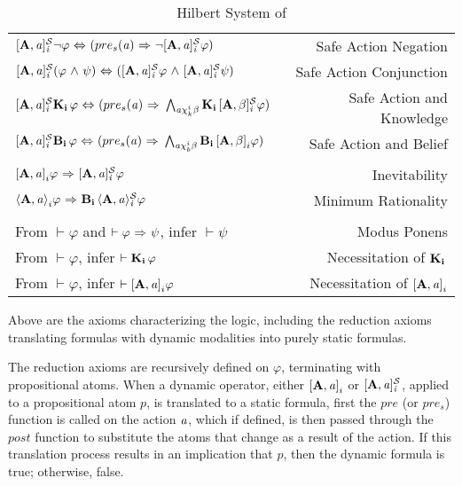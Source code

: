 \begin{table}[H]
\begin{center}
\begin{tabular}{| l r |}
    $\mathbf{[A,\mathit{a}]_{\mathit{i}}^\mathcal{S}}{\neg} \varphi {\ \Leftrightarrow \ } (pre_s(\mathit{a}) {\ \Rightarrow \ } {\neg} \mathbf{[A,\mathit{a}]_{\mathit{i}}^\mathcal{S}}\varphi)$ & Safe Action Negation\\
    $\mathbf{[A,\mathit{a}]_{\mathit{i}}^\mathcal{S}}(\varphi {\ \wedge \ } \psi) {\ \Leftrightarrow \ } (\mathbf{[A,\mathit{a}]_{\mathit{i}}^\mathcal{S}}\varphi {\ \wedge \ } \mathbf{[A,\mathit{a}]_{\mathit{i}}^\mathcal{S}}\psi)$ & Safe Action Conjunction\\
    $\mathbf{[A,\mathit{a}]_{\mathit{i}}^\mathcal{S}}\mathbf{K}_{\mathbf{i}}\,\varphi {\ \Leftrightarrow \ } (pre_s(\mathit{a}){\ \Rightarrow \ } \bigwedge_{\mathit{a}\chi_{k}^i\beta}\mathbf{K}_{\mathbf{i}}\,\mathbf{[A,\beta]_{\mathit{i}}^\mathcal{S}}\varphi)$ & Safe Action and Knowledge\\
    $\mathbf{[A,\mathit{a}]_{\mathit{i}}^\mathcal{S}}\mathbf{B}_{\mathbf{i}}\,\varphi {\ \Leftrightarrow \ } (pre_s(\mathit{a}){\ \Rightarrow \ } \bigwedge_{\mathit{a}\chi_{b}^i\beta}\mathbf{B}_{\mathbf{i}}\,\mathbf{[A,\beta]}_i\varphi)$ & Safe Action and Belief\\ 
	&\\
    $\mathbf{[A,\mathit{a}]}_i\varphi {\ \Rightarrow \ } \mathbf{[A,\mathit{a}]_{\mathit{i}}^\mathcal{S}}\varphi$ & Inevitability\\
    $\mathbf{\langle A,\mathit{a}\rangle}_i\varphi {\ \Rightarrow \ } \mathbf{B}_{\mathbf{i}}\,\mathbf{\langle A,\mathit{a}\rangle_{\mathit{i}}^\mathcal{S}}\varphi$ & Minimum Rationality\\
    &\\
    From $\vdash \varphi$ and $\vdash \varphi {\ \Rightarrow \ } \psi$, infer $\vdash\psi$ & Modus Ponens\\
    From $\vdash \varphi$, infer $\vdash \mathbf{K}_{\mathbf{i}}\,\varphi$ & Necessitation of $\mathbf{K}_{\mathbf{i}}\,$\\
    From $\vdash \varphi$, infer $\vdash \mathbf{[A,\mathit{a}]}_i\varphi$ & Necessitation of $\mathbf{[A,\mathit{a}]}_i$\\
	\hline
\end{tabular}
\caption{Hilbert System of \DASL}
\end{center}
\end{table}

Above are the axioms characterizing the logic, including the reduction axioms translating formulas with dynamic modalities into purely static formulas.

The reduction axioms are recursively defined on $\varphi$, terminating with propositional atoms. When a dynamic operator, either $\mathbf{[A,\mathit{a}]}_i$ or $\mathbf{[A,\mathit{a}]_{\mathit{i}}^\mathcal{S}}$, applied to a propositional atom $p$, is translated to a static formula, first the $pre$ (or $pre_s$) function is called on the action $\mathit{a}$, which if defined, is then passed through the $post$ function to substitute the atoms that change as a result of the action. If this translation process results in an implication that $p$, then the dynamic formula is true; otherwise, false.


